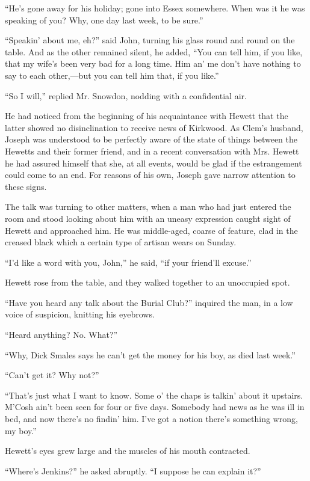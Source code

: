 ``He's gone away for his holiday; gone into {}Essex somewhere. When was
it he was speaking of you? Why, one day last week, to be sure.''

``Speakin' about me, eh?'' said John, turning his glass round and round
on the table. And as the other remained silent, he added, ``You can tell
him, if you like, that my wife's been very bad for a long time. Him an'
me don't have nothing to say to each other,---but you can tell him that,
if you like.''

``So I will,'' replied Mr. Snowdon, nodding with a confidential air.

He had noticed from the beginning of his acquaintance with Hewett that
the latter showed no disinclination to receive news of Kirkwood. As
Clem's husband, Joseph was understood to be perfectly aware of the state
of things between the Hewetts and their former friend, and in a recent
conversation with Mrs. Hewett he had assured himself that she, at all
events, would be glad if the estrangement could come to an end. For
reasons of his own, Joseph gave narrow attention to these signs.

{}The talk was turning to other matters, when a man who had just entered
the room and stood looking about him with an uneasy expression caught
sight of Hewett and approached him. He was middle-aged, coarse of
feature, clad in the creased black which a certain type of artisan wears
on Sunday.

``I'd like a word with you, John,'' he said, ``if your friend'll
excuse.''

Hewett rose from the table, and they walked together to an unoccupied
spot.

``Have you heard any talk about the Burial Club?'' inquired the man, in
a low voice of suspicion, knitting his eyebrows.

``Heard anything? No. What?''

``Why, Dick Smales says he can't get the money for his boy, as died last
week.''

``Can't get it? Why not?''

``That's just what I want to know. Some o' the chaps is talkin' about it
upstairs. M'Cosh ain't been seen for four or five days. Somebody had
news as he was ill in bed, and now there's no findin' him. I've got a
notion there's something wrong, my boy.''

{}Hewett's eyes grew large and the muscles of his mouth contracted.

``Where's Jenkins?'' he asked abruptly. ``I suppose he can explain it?''

